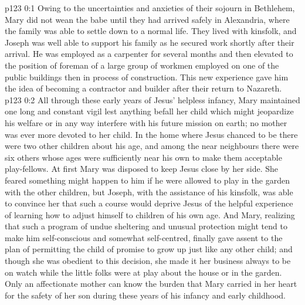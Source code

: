 \author{Midwayer Commission}
\vs p123 0:1 Owing to the uncertainties and anxieties of their sojourn in Bethlehem, Mary did not wean the babe until they had arrived safely in Alexandria, where the family was able to settle down to a normal life. They lived with kinsfolk, and Joseph was well able to support his family as he secured work shortly after their arrival. He was employed as a carpenter for several months and then elevated to the position of foreman of a large group of workmen employed on one of the public buildings then in process of construction. This new experience gave him the idea of becoming a contractor and builder after their return to Nazareth.
\vs p123 0:2 \pc All through these early years of Jesus’ helpless infancy, Mary maintained one long and constant vigil lest anything befall her child which might jeopardize his welfare or in any way interfere with his future mission on earth; no mother was ever more devoted to her child. In the home where Jesus chanced to be there were two other children about his age, and among the near neighbours there were six others whose ages were sufficiently near his own to make them acceptable play\hyp{}fellows. At first Mary was disposed to keep Jesus close by her side. She feared something might happen to him if he were allowed to play in the garden with the other children, but Joseph, with the assistance of his kinsfolk, was able to convince her that such a course would deprive Jesus of the helpful experience of learning how to adjust himself to children of his own age. And Mary, realizing that such a program of undue sheltering and unusual protection might tend to make him self\hyp{}conscious and somewhat self\hyp{}centred, finally gave assent to the plan of permitting the child of promise to grow up just like any other child; and though she was obedient to this decision, she made it her business always to be on watch while the little folks were at play about the house or in the garden. Only an affectionate mother can know the burden that Mary carried in her heart for the safety of her son during these years of his infancy and early childhood.
